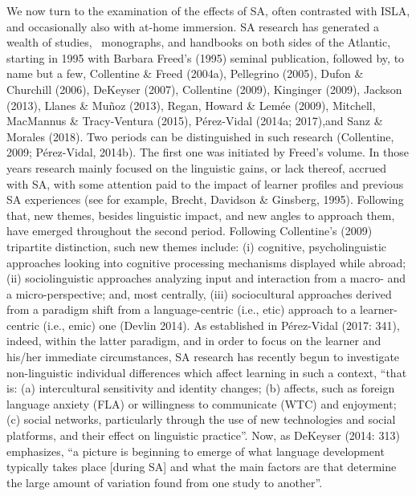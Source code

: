 \begin{styleStandard}
We now turn to the examination of the effects of SA, often contrasted with ISLA, and occasionally also with at-home immersion. SA research has generated a wealth of studies, \ monographs, and handbooks on both sides of the Atlantic, starting in 1995 with Barbara Freed’s (1995) seminal publication, followed by, to name but a few, Collentine \& Freed (2004a), Pellegrino (2005), Dufon \& Churchill (2006), DeKeyser (2007), Collentine (2009), Kinginger (2009), Jackson (2013), Llanes \& Muñoz (2013), Regan, Howard \& Lemée (2009), Mitchell, MacMannus \& Tracy-Ventura (2015), Pérez-Vidal (2014a; 2017),and Sanz \& Morales (2018). Two periods can be distinguished in such research (Collentine, 2009; Pérez-Vidal, 2014b). The first one was initiated by Freed’s volume. In those years research mainly focused on the linguistic gains, or lack thereof, accrued with SA, with some attention paid to the impact of learner profiles and previous SA experiences (see for example, Brecht, Davidson \& Ginsberg, 1995). Following that, new themes, besides linguistic impact, and new angles to approach them, have emerged throughout the second period. Following Collentine’s (2009) tripartite distinction, such new themes include: (i) cognitive, psycholinguistic approaches looking into cognitive processing mechanisms displayed while abroad; (ii) sociolinguistic approaches analyzing input and interaction from a macro- and a micro-perspective; and, most centrally, (iii) sociocultural approaches derived from a paradigm shift from a language-centric (i.e., etic) approach to a learner-centric (i.e., emic) one (Devlin 2014). As established in Pérez-Vidal (2017: 341), indeed, within the latter paradigm, and in order to focus on the learner and his/her immediate circumstances, SA research has recently begun to investigate non-linguistic individual differences which affect learning in such a context, “that is: (a) intercultural sensitivity and identity changes; (b) affects, such as foreign language anxiety (FLA) or willingness to communicate (WTC) and enjoyment; (c) social networks, particularly through the use of new technologies and social platforms, and their effect on linguistic practice”. Now, as DeKeyser (2014: 313) emphasizes, “a picture is beginning to emerge of what language development typically takes place [during SA] and what the main factors are that determine the large amount of variation found from one study to another”. 
\end{styleStandard}

